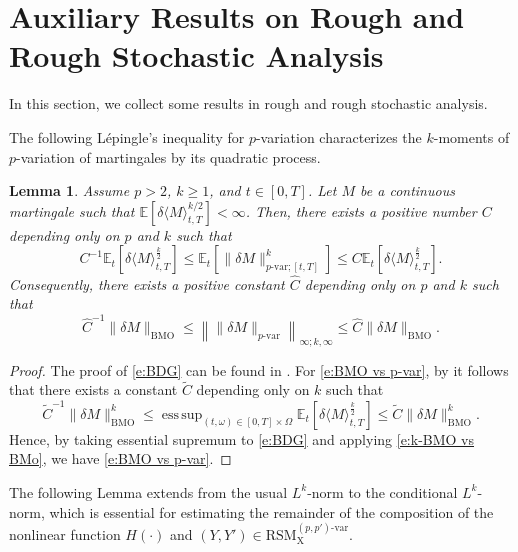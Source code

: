 \documentclass[11pt,reqno]{amsart}
\newtheorem{lemma}{Lemma}[section]
\DeclareMathOperator*{\esssup}{ess\,sup}
\numberwithin{equation}{section}
\def\E{\mathbb E}
\begin{document}
\section{Auxiliary Results on Rough and Rough Stochastic Analysis}\label{sec:Appendix A}

In this section, we collect some results in rough and rough stochastic analysis.

The following L\'epingle's inequality for $p$-variation characterizes the $k$-moments of $p$-variation of martingales by its quadratic process.

\begin{lemma}\label{lem:Lepingle}
Assume $p>2$, $k\ge 1$, and $t\in[0,T]$. Let $M$ be a continuous martingale such that $\E[\delta \langle M\rangle_{t,T}^{k/2}]<\infty$.  Then, there exists a positive number $C$ depending only on $p$ and $k$ such that
\begin{equation}\label{e:BDG}
C^{-1}\E_{t}[\delta \langle M\rangle_{t,T}^{\frac k2}]\le \E_{t}[\|\delta M\|^{k}_{p\text{-}\mathrm{var};[t,T]}] \le C\E_{t}[ \delta \langle M\rangle_{t,T}^{\frac k2}].
\end{equation}
Consequently, there exists a positive constant $\hat C$ depending only on $p$ and $k$ such that 
\begin{equation}\label{e:BMO vs p-var}
\hat C^{-1}\|\delta M\|_{\mathrm{BMO}} \le \left\|\|\delta M\|_{p\text{-}\mathrm{var}}\right\|_{\infty;k,\infty} \le \hat C \|\delta M\|_{\mathrm{BMO}}.
\end{equation}
\end{lemma}

\begin{proof}
The proof of \eqref{e:BDG} can be found in \cite[Theorem~14.12]{friz2010multidimensional}. For \eqref{e:BMO vs p-var}, by \cite[Corollary~2.1]{Kazamaki1994} it follows that there exists a constant $\tilde{C}$ depending only on $k$ such that
\begin{equation}\label{e:k-BMO vs BMo}
\tilde{C}^{-1}\|\delta M\|^k_{\mathrm{BMO}} \le \esssup_{(t,\omega)\in[0,T]\times\Omega} \E_{t}[\delta \langle M\rangle_{t,T}^{\frac k2}] \le \tilde{C}\|\delta M\|^k_{\mathrm{BMO}}.
\end{equation}
Hence, by taking essential supremum to \eqref{e:BDG} and applying \eqref{e:k-BMO vs BMo}, we have \eqref{e:BMO vs p-var}.
\end{proof}

The following Lemma extends  \cite[Theorem~1.1]{friz2023rough} from the usual $L^k$-norm to the conditional $L^{k}$-norm, which is essential for estimating the remainder of the composition of the nonlinear function $H(\bm\cdot)$ and $(Y,Y') \in \mathrm{RSM}^{(p,p')\text{-}\mathrm{var}}_{\mathrm X}$. 
\end{document}
